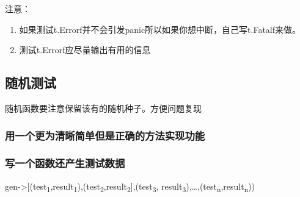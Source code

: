 注意：

\begin{enumerate}
\tightlist
\item
  如果测试t.Errorf并不会引发panic所以如果你想中断，自己写t.Fatalf来做。
\item
  测试t.Errorf应尽量输出有用的信息
\end{enumerate}

\hypertarget{ux968fux673aux6d4bux8bd5}{%
\subsection{随机测试}\label{ux968fux673aux6d4bux8bd5}}

随机函数要注意保留该有的随机种子。方便问题复现

\hypertarget{ux7528ux4e00ux4e2aux66f4ux4e3aux6e05ux6670ux7b80ux5355ux4f46ux662fux6b63ux786eux7684ux65b9ux6cd5ux5b9eux73b0ux529fux80fd}{%
\subsubsection{用一个更为清晰简单但是正确的方法实现功能}\label{ux7528ux4e00ux4e2aux66f4ux4e3aux6e05ux6670ux7b80ux5355ux4f46ux662fux6b63ux786eux7684ux65b9ux6cd5ux5b9eux73b0ux529fux80fd}}

\hypertarget{ux5199ux4e00ux4e2aux51fdux6570ux8fd8ux4ea7ux751fux6d4bux8bd5ux6570ux636e}{%
\subsubsection{写一个函数还产生测试数据}\label{ux5199ux4e00ux4e2aux51fdux6570ux8fd8ux4ea7ux751fux6d4bux8bd5ux6570ux636e}}

gen-\textgreater{}{[}(test\textsubscript{1},result\textsubscript{1}),(test\textsubscript{2},result\textsubscript{2}{]},(test\textsubscript{3},
result\textsubscript{3}),\ldots{},(test\textsubscript{n},result\textsubscript{n}))

